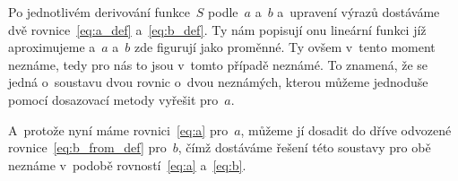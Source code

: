 Po jednotlivém derivování funkce~$S$ podle~$a$ a~$b$ a~upravení výrazů
dostáváme dvě rovnice~\eqref{eq:a_def} a~\eqref{eq:b_def}. Ty nám popisují onu
lineární funkci jíž aproximujeme a~$a$ a~$b$ zde figurují jako proměnné. Ty
ovšem v~tento moment neznáme, tedy pro nás to jsou v~tomto případě neznámé.
To znamená, že se jedná o~soustavu dvou rovnic o~dvou neznámých, kterou můžeme
jednoduše pomocí dosazovací metody vyřešit pro~$a$.

A~protože nyní máme rovnici~\eqref{eq:a}  pro~$a$, můžeme jí dosadit do dříve
odvozené rovnice~\eqref{eq:b_from_def}  pro~$b$, čímž dostáváme řešení této
soustavy pro obě neznáme v~podobě rovností~\eqref{eq:a} a~\eqref{eq:b}.
